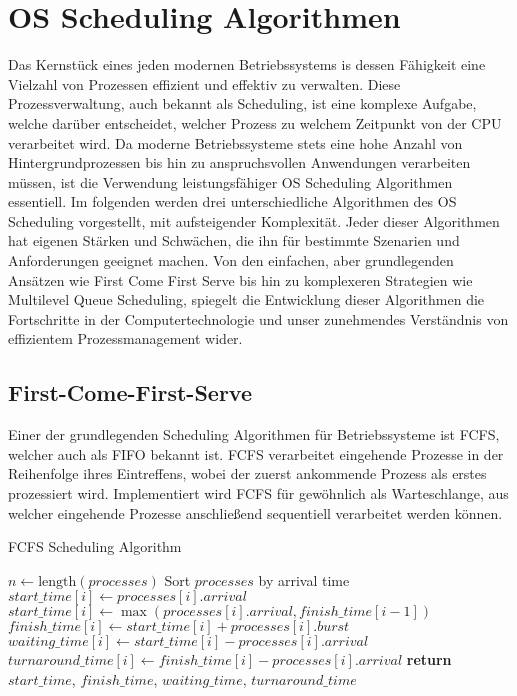 \chapter{OS Scheduling Algorithmen}
Das Kernstück eines jeden modernen Betriebssystems is dessen Fähigkeit eine Vielzahl von Prozessen effizient und effektiv zu verwalten. Diese Prozessverwaltung, auch bekannt als Scheduling, ist eine komplexe Aufgabe, welche darüber entscheidet, welcher Prozess zu welchem Zeitpunkt von der \ac{CPU} verarbeitet wird. Da moderne Betriebssysteme stets eine hohe Anzahl von Hintergrundprozessen bis hin zu anspruchsvollen Anwendungen verarbeiten müssen, ist die Verwendung leistungsfähiger OS Scheduling Algorithmen essentiell. Im folgenden werden drei unterschiedliche Algorithmen des OS Scheduling vorgestellt, mit aufsteigender Komplexität. Jeder dieser Algorithmen hat eigenen Stärken und Schwächen, die ihn für bestimmte Szenarien und Anforderungen geeignet machen. Von den einfachen, aber grundlegenden Ansätzen wie First Come First Serve bis hin zu komplexeren Strategien wie Multilevel Queue Scheduling, spiegelt die Entwicklung dieser Algorithmen die Fortschritte in der Computertechnologie und unser zunehmendes Verständnis von effizientem Prozessmanagement wider.

\section{First-Come-First-Serve}

Einer der grundlegenden Scheduling Algorithmen für Betriebssysteme ist \ac{FCFS}, welcher auch als \ac{FIFO} bekannt ist. \ac{FCFS} verarbeitet eingehende Prozesse in der Reihenfolge ihres Eintreffens, wobei der zuerst ankommende Prozess als erstes prozessiert wird. Implementiert wird \ac{FCFS} für gewöhnlich als Warteschlange, aus welcher eingehende Prozesse anschließend sequentiell verarbeitet werden können. 

\begin{algorithm}
	\caption{\ac{FCFS} Scheduling Algorithm}
	\label{alg:fcfs}
	\begin{algorithmic}[1]
		\State $n \gets \text{length}(processes)$
		\State Sort $processes$ by arrival time
		\State $start\_time[i] \gets processes[i].arrival$
		\Else
		\State $start\_time[i] \gets \max(processes[i].arrival, finish\_time[i-1])$
		\EndIf
		\State $finish\_time[i] \gets start\_time[i] + processes[i].burst$
		\State $waiting\_time[i] \gets start\_time[i] - processes[i].arrival$
		\State $turnaround\_time[i] \gets finish\_time[i] - processes[i].arrival$
		\EndFor
		\State \textbf{return} $start\_time$, $finish\_time$, $waiting\_time$, $turnaround\_time$
		\EndProcedure
	\end{algorithmic}
\end{algorithm}

